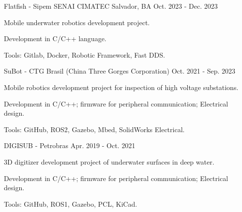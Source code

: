 

\begin{cventries}

\cventry
{Flatfish - Sipem} %
{SENAI CIMATEC} %
{Salvador, BA} %
{Oct. 2023 - Dec. 2023} %
{
  \begin{cvitems} %
    \item {Mobile underwater robotics development project.}
    \item {Development in C/C++ language.}
    \item {Tools: Gitlab, Docker, Robotic Framework, Fast DDS.}
  \end{cvitems}
}

  \cventry
    {SuBot - CTG Brasil (China Three Gorges Corporation)} %
    {} %
    {} %
    {Oct. 2021 - Sep. 2023} %
    {
      \begin{cvitems} %
        \item {Mobile robotics development project for inspection of high voltage substations.}
        \item {Development in C/C++; firmware for peripheral communication; Electrical design.}
        \item {Tools: GitHub, ROS2, Gazebo, Mbed, SolidWorks Electrical.}
      \end{cvitems}
    }


  \cventry
    {DIGISUB - Petrobras} %
    {} %
    {} %
    {Apr. 2019 - Oct. 2021} %
    {
      \begin{cvitems} %
        \item {3D digitizer development project of underwater surfaces in deep water.}
        \item {Development in C/C++; firmware for peripheral communication; Electrical design.}
        \item {Tools: GitHub, ROS1, Gazebo, PCL, KiCad.}
      \end{cvitems}
    }



\end{cventries}
